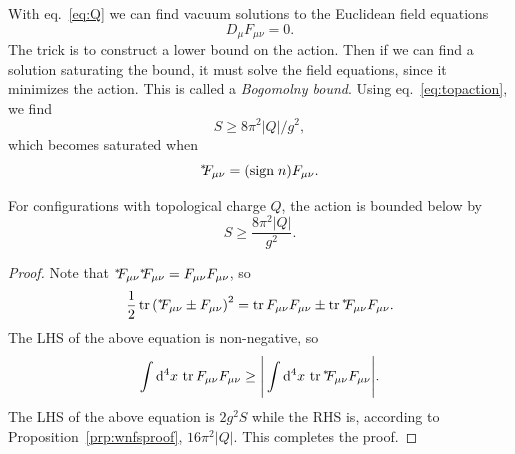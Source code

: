 With eq.~\eqref{eq:Q} we can find vacuum solutions to the Euclidean
field equations
\begin{equation}
  D_\mu F_{\mu\nu}=0.
\end{equation}
The trick is to construct a lower bound on the action. Then if we can
find a solution saturating the bound, it must solve the field equations,
since it minimizes the action. This is called a 
{\it Bogomolny bound}.
Using eq.~\eqref{eq:topaction}, we find
\begin{equation}\label{eq:bogo}
  S\geq 8\pi^2|Q|/g^2,
\end{equation}
which becomes saturated when
\begin{equation}\label{eq:efeq}
  {}^{*\hspace{-1mm}}{F_{\mu\nu}}=(\text{sign}\;n)F_{\mu\nu}.
\end{equation}
\begin{proposition}{}{}
For configurations with topological charge $Q$,
the action is bounded below by
$$
  S\geq\frac{8\pi^2|Q|}{g^2}.
$$
  \begin{proof}
    Note that ${}^{*\hspace{-1mm}}{F_{\mu\nu}}{}^{*\hspace{-1mm}}{F_{\mu\nu}}=F_{\mu\nu}F_{\mu\nu}$, so
    $$
      \frac{1}{2}\tr\left(\dual{F_{\mu\nu}\pm F_{\mu\nu}}\right)^2
       =\tr F_{\mu\nu}F_{\mu\nu}\pm\tr\dual{F_{\mu\nu}}F_{\mu\nu}.
    $$
    The LHS of the above equation is non-negative, so
    $$
      \int\dd^4x\,\tr F_{\mu\nu}F_{\mu\nu}\geq
      \Bigg|\int\dd^4x\,\tr\dual{F_{\mu\nu}}F_{\mu\nu}\Bigg|.
    $$
    The LHS of the above equation is $2g^2S$ while the RHS
    is, according to Proposition~\ref{prp:wnfsproof}, $16\pi^2|Q|$.
    This completes the proof.
  \end{proof}
\end{proposition}

